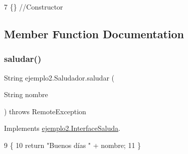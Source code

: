 \begin{DoxyCode}
7 \{\}                 \textcolor{comment}{//Constructor}
\end{DoxyCode}


\subsection{Member Function Documentation}
\mbox{\label{classejemplo2_1_1_saludador_a5db6e424a0c2570a9b66f4828041f9b3}} 
\subsubsection{\texorpdfstring{saludar()}{saludar()}}
{\footnotesize\ttfamily String ejemplo2.\+Saludador.\+saludar (\begin{DoxyParamCaption}\item[{String}]{nombre }\end{DoxyParamCaption}) throws Remote\+Exception\hspace{0.3cm}{\ttfamily [inline]}}



Implements \mbox{\hyperlink{interfaceejemplo2_1_1_interface_saluda_a0594b234523ba7e36f0fb05b6f2d007e}{ejemplo2.\+Interface\+Saluda}}.


\begin{DoxyCode}
9     \{   
10         \textcolor{keywordflow}{return} \textcolor{stringliteral}{"Buenos días "} + nombre;
11     \}
\end{DoxyCode}
